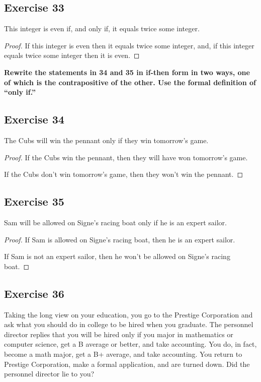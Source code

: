 \documentclass[14pt]{extarticle}
\begin{document}
\subsection{Exercise 33}
This integer is even if, and only if, it equals twice some integer.

\begin{proof}
    If this integer is even then it equals twice some integer, and, if this integer equals twice some integer then it is even. \end{proof}

{\bf Rewrite the statements in 34 and 35 in if-then form in two ways, one of which is the contrapositive of the other. Use the formal definition of “only if.”}

\subsection{Exercise 34}
The Cubs will win the pennant only if they win tomorrow’s game.

\begin{proof}
    If the Cubs win the pennant, then they will have won tomorrow’s game.

    If the Cubs don't win tomorrow's game, then they won't win the pennant.
\end{proof}

\subsection{Exercise 35}
Sam will be allowed on Signe’s racing boat only if he is an expert sailor.

\begin{proof}
    If Sam is allowed on Signe’s racing boat, then he is an expert sailor.

    If Sam is not an expert sailor, then he won't be allowed on Signe’s racing boat.
\end{proof}

\subsection{Exercise 36}
Taking the long view on your education, you go to the Prestige Corporation and ask what you should do in college to be hired when you graduate. The personnel director replies that you will be hired only if you major in mathematics or computer science, get a B average or better, and take accounting. You do, in fact, become a math major, get a B+ average, and take accounting. You return to Prestige Corporation, make a formal application, and are turned down. Did the personnel director lie to you?
\end{document}
